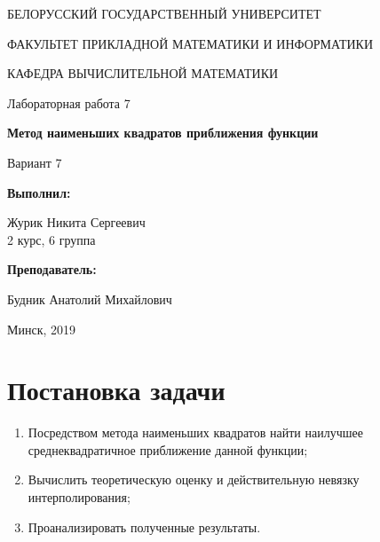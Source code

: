 \documentclass[14pt, a4paper]{article}
\begin{document}
\begin{titlepage}
\begin{center}
\large{БЕЛОРУССКИЙ ГОСУДАРСТВЕННЫЙ УНИВЕРСИТЕТ 

ФАКУЛЬТЕТ ПРИКЛАДНОЙ МАТЕМАТИКИ И ИНФОРМАТИКИ

КАФЕДРА ВЫЧИСЛИТЕЛЬНОЙ МАТЕМАТИКИ}
\end{center}
\vspace*{\fill}
\begin{center}
Лабораторная работа 7

\large{\textbf{Метод наименьших квадратов приближения функции}}

Вариант 7
\end{center}
\begin{flushright}
\textbf{Выполнил:}

Журик Никита Сергеевич \\ 2 курс, 6 группа

\textbf{Преподаватель:}

Будник Анатолий Михайлович
\end{flushright}
\vspace*{\fill}
\begin{center}
Минск, 2019
\end{center}
\end{titlepage}

\tableofcontents
\newpage

\newpage
{}

  \section{Постановка задачи}
    \begin{enumerate}
      \item
      Посредством метода наименьших квадратов найти наилучшее среднеквадратичное приближение данной функции;
      \item
      Вычислить теоретическую оценку и действительную невязку интерполирования;
      \item
      Проанализировать полученные результаты.
    \end{enumerate}
\end{document}
